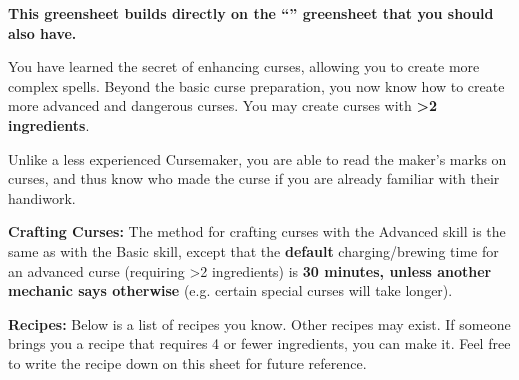 \documentclass[green]{GL2020}
\begin{document}
\name{\gCursemakingAdvanced{}}

\textbf{This greensheet builds directly on the ``\gCursemakingBasic{}'' greensheet that you should also have.}

You have learned the secret of enhancing curses, allowing you to create more complex spells. Beyond the basic curse preparation, you now know how to create more advanced and dangerous curses. You may create curses with \textbf{ >2 ingredients}.

Unlike a less experienced Cursemaker, you are able to read the maker’s marks on curses, and thus know who made the curse if you are already familiar with their handiwork.

\textbf{Crafting Curses:}
The method for crafting curses with the Advanced skill is the same as with the Basic skill, except that the \textbf{default} charging/brewing time for an advanced curse (requiring >2 ingredients) is \textbf{30 minutes, unless another mechanic says otherwise} (e.g. certain special curses will take longer).

\textbf{Recipes:}
Below is a list of recipes you know. Other recipes may exist. If someone brings you a recipe that requires 4 or fewer ingredients, you can make it. Feel free to write the recipe down on this sheet for future reference.
\end{document}
